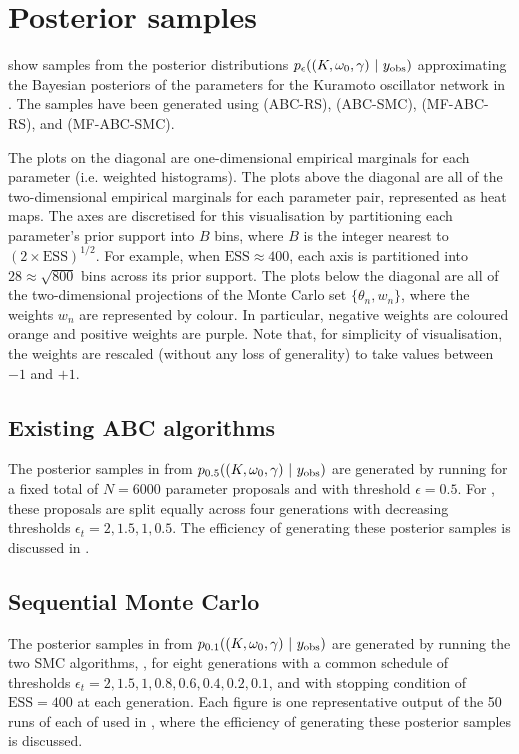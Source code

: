 \documentclass[demo,supplement,review]{siamonline190516}
\begin{document}
\section{Posterior samples}
show samples from the posterior distributions $p_\epsilon((K, \omega_0, \gamma)~|~y_{\mathrm{obs}})$ approximating the Bayesian posteriors of the parameters for the Kuramoto oscillator network in .
The samples have been generated using  (ABC-RS),  (ABC-SMC),  (MF-ABC-RS), and  (MF-ABC-SMC).

The plots on the diagonal are one-dimensional empirical marginals for each parameter (i.e. weighted histograms).
The plots above the diagonal are all of the two-dimensional empirical marginals for each parameter pair, represented as heat maps.
The axes are discretised for this visualisation by partitioning each parameter's prior support into $B$ bins, where $B$ is the integer nearest to $(2 \times \mathrm{ESS})^{1/2}$.
For example, when $\mathrm{ESS} \approx 400$, each axis is partitioned into $28 \approx \sqrt{800}$ bins across its prior support.
The plots below the diagonal are all of the two-dimensional projections of the Monte Carlo set $\{ \theta_n, w_n \}$, where the weights $w_n$ are represented by colour.
In particular, negative weights are coloured orange and positive weights are purple.
Note that, for simplicity of visualisation, the weights are rescaled (without any loss of generality) to take values between $-1$ and $+1$.

\subsection{Existing ABC algorithms}
The posterior samples in  from $p_{0.5}((K, \omega_0, \gamma)~|~y_{\mathrm{obs}})$ are generated by running  for a fixed total of $N=6000$ parameter proposals and with threshold $\epsilon = 0.5$. 
For , these proposals are split equally across four generations with decreasing thresholds $\epsilon_t = 2, 1.5, 1, 0.5$. 
The efficiency of generating these posterior samples is discussed in .

\subsection{Sequential Monte Carlo}
The posterior samples in  from $p_{0.1}((K, \omega_0, \gamma)~|~y_{\mathrm{obs}})$ are generated by running the two SMC algorithms, , for eight generations with a common schedule of thresholds $\epsilon_t = 2, 1.5, 1, 0.8, 0.6, 0.4, 0.2, 0.1$, and with stopping condition of $\mathrm{ESS}=400$ at each generation.
Each figure is one representative output of the 50 runs of each of  used in , where the efficiency of generating these posterior samples is discussed.
\end{document}
